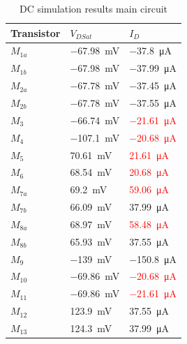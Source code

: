 \begin{table}[H]
    \centering
    \caption{DC simulation results main circuit}
    \begin{tabularx}{\textwidth}{>{\centering\arraybackslash}X >{\centering\arraybackslash}X >{\centering\arraybackslash}X}
        \toprule
        \textbf{Transistor} & \textbf{$V_{DSat}$} & \textbf{$I_D$}\\
        \midrule
        $M_{1a}$ & \SI{-67.98}{\milli\volt} & \SI{-37.8}{\micro\ampere}\\
        \midrule
        $M_{1b}$ & \SI{-67.98}{\milli\volt} & \SI{-37.99}{\micro\ampere}\\
        \midrule
        $M_{2a}$ & \SI{-67.78}{\milli\volt} & \SI{-37.45}{\micro\ampere}\\
        \midrule
        $M_{2b}$ & \SI{-67.78}{\milli\volt} & \SI{-37.55}{\micro\ampere}\\
        \midrule
        $M_{3}$ & \SI{-66.74}{\milli\volt} & \textcolor{red}{\SI{-21.61}{\micro\ampere}}\\
        \midrule
        $M_{4}$ & \SI{-107.1}{\milli\volt} & \textcolor{red}{\SI{-20.68}{\micro\ampere}}\\
        \midrule
        $M_{5}$ & \SI{70.61}{\milli\volt} & \textcolor{red}{\SI{21.61}{\micro\ampere}}\\
        \midrule
        $M_{6}$ & \SI{68.54}{\milli\volt} & \textcolor{red}{\SI{20.68}{\micro\ampere}}\\
        \midrule
        $M_{7a}$ & \SI{69.2}{\milli\volt} & \textcolor{red}{\SI{59.06}{\micro\ampere}}\\
        \midrule
        $M_{7b}$ & \SI{66.09}{\milli\volt} & \SI{37.99}{\micro\ampere}\\
        \midrule
        $M_{8a}$ & \SI{68.97}{\milli\volt} & \textcolor{red}{\SI{58.48}{\micro\ampere}}\\
        \midrule
        $M_{8b}$ & \SI{65.93}{\milli\volt} & \SI{37.55}{\micro\ampere}\\
        \midrule
        $M_{9}$ & \SI{-139}{\milli\volt} & \SI{-150.8}{\micro\ampere}\\
        \midrule
        $M_{10}$ & \SI{-69.86}{\milli\volt} & \textcolor{red}{\SI{-20.68}{\micro\ampere}}\\
        \midrule
        $M_{11}$ & \SI{-69.86}{\milli\volt} & \textcolor{red}{\SI{-21.61}{\micro\ampere}}\\
        \midrule
        $M_{12}$ & \SI{123.9}{\milli\volt} & \SI{37.55}{\micro\ampere}\\
        \midrule
        $M_{13}$ & \SI{124.3}{\milli\volt} & \SI{37.99}{\micro\ampere}\\
        \bottomrule
    \end{tabularx}
    \label{tab:DC-RFC}
\end{table}

